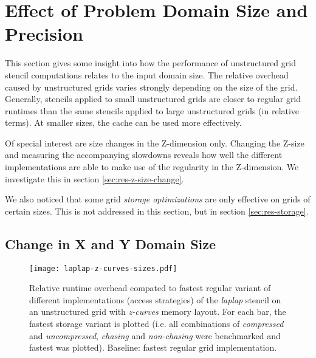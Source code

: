\section{Effect of Problem Domain Size and Precision} \label{sec:res-size}

This section gives some insight into how the performance of unstructured grid stencil computations relates to the input domain size. The relative overhead caused by unstructured grids varies strongly depending on the size of the grid. Generally, stencils applied to small unstructured grids are closer to regular grid runtimes than the same stencils applied to large unstructured grids (in relative terms). At smaller sizes, the cache can be used more effectively.

Of special interest are size changes in the Z-dimension only. Changing the Z-size and measuring the accompanying slowdowns reveals how well the different implementations are able to make use of the regularity in the Z-dimension. We investigate this in section \ref{sec:res-z-size-change}.

We also noticed that some grid \emph{storage optimizations} are only effective on grids of certain sizes. This is not addressed in this section, but in section \ref{sec:res-storage}.

\subsection{Change in X and Y Domain Size}

\begin{figure}
	\begin{center}
    \texttt{[image: laplap-z-curves-sizes.pdf]}
	\end{center}
    \caption{\label{fig:variants-gridsizes} Relative runtime overhead compated to fastest regular variant of different implementations (access strategies) of the \emph{laplap} stencil on an unstructured grid with \emph{z-curves} memory layout. For each bar, the fastest storage variant is plotted (i.e. all combinations of \emph{compressed} and \emph{uncompressed}, \emph{chasing} and \emph{non-chasing} were benchmarked and fastest was plotted). Baseline: fastest regular grid implementation.}
\end{figure}

